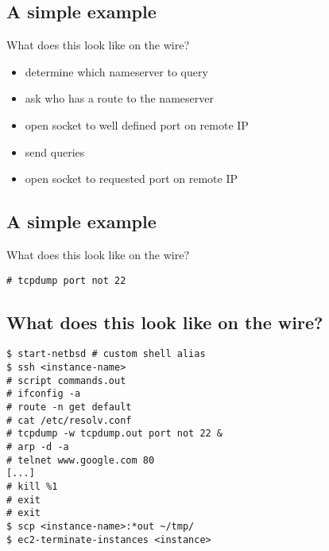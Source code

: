 \documentclass[xga]{xdvislides}
\begin{document}
%
\Normalsize

\subsection{A simple example}
What does this look like on the wire?
\\

\begin{itemize}
	\item determine which nameserver to query
	\item ask who has a route to the nameserver
	\item open socket to well defined port on remote IP
	\item send queries
	\item open socket to requested port on remote IP
\end{itemize}

\subsection{A simple example}
What does this look like on the wire?
\vspace*{1in}
\\
\Hugesize
\begin{center}
\begin{verbatim}
# tcpdump port not 22
\end{verbatim}
\end{center}
\Normalsize
\vspace*{\fill}

\subsection{What does this look like on the wire?}
\begin{verbatim}
$ start-netbsd # custom shell alias
$ ssh <instance-name>
# script commands.out
# ifconfig -a
# route -n get default
# cat /etc/resolv.conf
# tcpdump -w tcpdump.out port not 22 &
# arp -d -a
# telnet www.google.com 80
[...]
# kill %1
# exit
# exit
$ scp <instance-name>:*out ~/tmp/
$ ec2-terminate-instances <instance>
\end{verbatim}
\end{document}
